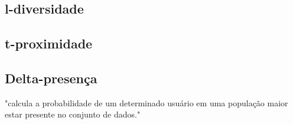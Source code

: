 \subsection{l-diversidade}

\subsection{t-proximidade}

\subsection{Delta-presença}
"calcula a probabilidade de um determinado usuário em uma população maior estar presente no conjunto de dados."






